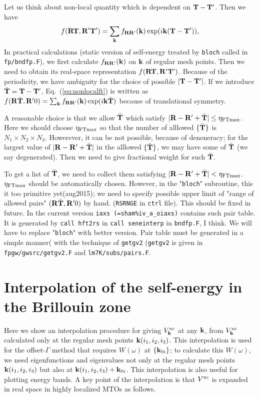 \documentclass[a4paper,10pt,epsf,fleqn]{article}
\def\vxc{V^{\rm xc}}
\newcommand{\bfk}{{\bf k}}
\newcommand{\bfT}{{\bf T}}
\newcommand{\bfR}{{\bf R}}
\newcommand{\req}[1]{\mbox{Eq.~(\ref{#1})}}
\begin{document}
Let us think about non-local quantity which is dependent on $\bfT-\bfT'$. Then we have
\begin{eqnarray}
f(\bfR\bfT,\bfR'\bfT')=\sum_\bfk 
f_{\bfR\bfR'}(\bfk) \exp(i \bfk (\bfT-\bfT')),
\label{eq:nonlocalft}
\end{eqnarray}
In practical calculations (static version of self-energy treated by
{\tt bloch} called in {\tt fp/bndfp.F}), 
we first calculate $f_{\bfR\bfR'}(\bfk)$ on $\bfk$ of regular mesh points. Then we
need to obtain its real-space representation
$f(\bfR\bfT,\bfR'\bfT')$. Because of the periodicity,
we have ambiguity for the choice of possible 
$|\bfT-\bfT'|$. If we introduce $\bar{\bf T}=\bfT-\bfT'$,
\req{eq:nonlocalft} is written as
$f(\bfR\bar{\bfT},\bfR'0)=\sum_\bfk 
f_{\bfR\bfR'}(\bfk) \exp(i \bfk \bar{\bfT})$ because of translational symmetry.

A reasonable choice is that we allow $\bar{\bfT}$
which satisfy $|\bfR-\bfR'+\bar{\bfT}|\le\eta_{\rm FTmax}$.
Here we should choose $\eta_{\rm FTmax}$ so that
the number of alllowed $\{\bar{\bf T}\}$ is $N_1 \times N_2 \times N_3$.
Howerever, it can be not possible, because of
deneneracy; for the largest value of $|\bfR-\bfR'+\bar{\bfT}|$ in the
alllowed $\{\bar{\bf T}\}$, we may 
have some of $\bar{\bfT}$ (we say degenerated). 
Then we need to give fractional weight for such $\bar{\bfT}$.

To get a list of $\bar{\bfT}$,
we need to collect them satisfying 
$|\bfR-\bfR'+\bar{\bf T}|<\eta_{\rm FTmax}$.
$\eta_{\rm FTmax}$ should be automatically chosen.
However, in the "{\tt bloch}" subroutine, this it too primitive yet(aug2015);
we need to specify possible upper limit of 
"range of allowed pairs" $(\bfR\bar{\bfT},\bfR'0)$ by hand.
({\tt RSRNGE} in {\tt ctrl} file). This should be fixed in future.
In the current version {\tt iaxs (=\verb#sham%iv_a_oiaxs#)} contains such pair table.
It is generated by {\tt call hft2rs} in {\tt call seneinterp} in {\tt bndfp.F}, I think.
We will have to replace "{\tt bloch}" with better version. Pair table must be generated 
in a simple manner( with the technique of 
{\tt getgv2} ({\tt getgv2} is given in {\tt fpgw/gwsrc/getgv2.F} and {\tt lm7K/subs/pairs.F}. 


\section{Interpolation of the self-energy in the Brillouin zone}
\label{sec:siginterp}
Here we show 
an interpolation procedure for giving
$\vxc_{\bfk}$ at any $\bfk$,
from $\vxc_{\bfk}$ calculated only at the regular mesh points $\bfk(i_1,i_2,i_3)$.
This interpolation is used for the offset-$\Gamma$ method that
requires $W(\omega)$ at $\{\bfk_{0i}\}$;
to calculate this $W(\omega)$, we need 
eigenfunctions and eigenvalues not only 
at the regular mesh points $\bfk(i_1,i_2,i_3)$
but also at $\bfk(i_1,i_2,i_3)+\bfk_{0i}$. 
This interpolation is also useful for plotting
energy bands. %
A key point of the interpolation is that $\vxc$ 
is expanded in real space in highly localized MTOs as follows.
\end{document}

